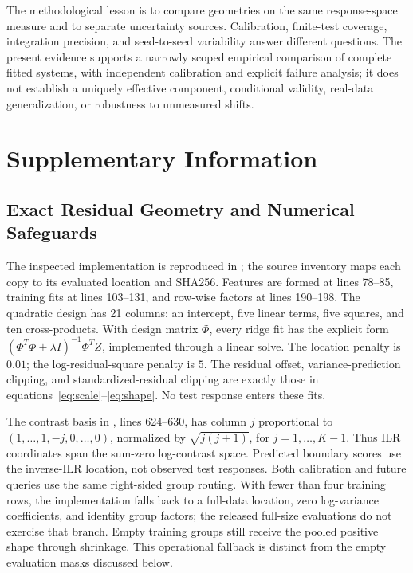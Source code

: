 \documentclass{article}
\begin{document}
The methodological lesson is to compare geometries on the same response-space measure and to separate uncertainty sources. Calibration, finite-test coverage, integration precision, and seed-to-seed variability answer different questions. The present evidence supports a narrowly scoped empirical comparison of complete fitted systems, with independent calibration and explicit failure analysis; it does not establish a uniquely effective component, conditional validity, real-data generalization, or robustness to unmeasured shifts.

\clearpage


\clearpage
\appendix
\section{Supplementary Information}
\subsection{Exact Residual Geometry and Numerical Safeguards}
The inspected implementation is reproduced in ; the source inventory maps each copy to its evaluated location and SHA256. Features are formed at lines 78--85, training fits at lines 103--131, and row-wise factors at lines 190--198. The quadratic design has 21 columns: an intercept, five linear terms, five squares, and ten cross-products. With design matrix $\Phi$, every ridge fit has the explicit form $(\Phi^T\Phi+\lambda I)^{-1}\Phi^TZ$, implemented through a linear solve. The location penalty is $0.01$; the log-residual-square penalty is $5$. The residual offset, variance-prediction clipping, and standardized-residual clipping are exactly those in equations~\eqref{eq:scale}--\eqref{eq:shape}. No test response enters these fits.

The contrast basis in , lines 624--630, has column $j$ proportional to $(1,\ldots,1,-j,0,\ldots,0)$, normalized by $\sqrt{j(j+1)}$, for $j=1,\ldots,K-1$. Thus ILR coordinates span the sum-zero log-contrast space. Predicted boundary scores use the inverse-ILR location, not observed test responses. Both calibration and future queries use the same right-sided group routing. With fewer than four training rows, the implementation falls back to a full-data location, zero log-variance coefficients, and identity group factors; the released full-size evaluations do not exercise that branch. Empty training groups still receive the pooled positive shape through shrinkage. This operational fallback is distinct from the empty evaluation masks discussed below.
\end{document}
